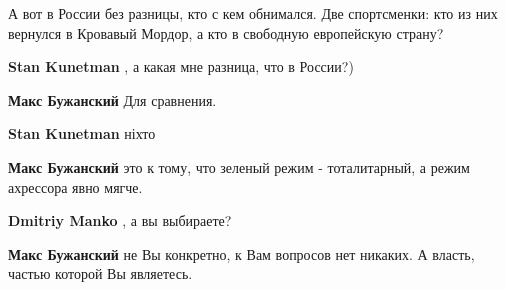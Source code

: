 \begin{itemize}
А вот в России без разницы, кто с кем обнимался. Две спортсменки: кто из них
вернулся в Кровавый Мордор, а кто в свободную европейскую страну?

\begin{itemize}
 
\textbf{Stan Kunetman} , а какая мне разница, что в России?)

 
\textbf{Макс Бужанский} Для сравнения.

 
\textbf{Stan Kunetman} ніхто

 
\textbf{Макс Бужанский} это к тому, что зеленый режим - тоталитарный, а режим ахрессора явно мягче.

 
\textbf{Dmitriy Manko} , а вы выбираете?

 
\textbf{Макс Бужанский} не Вы конкретно, к Вам вопросов нет никаких. А власть, частью которой Вы являетесь.


\end{itemize}
\end{itemize}
